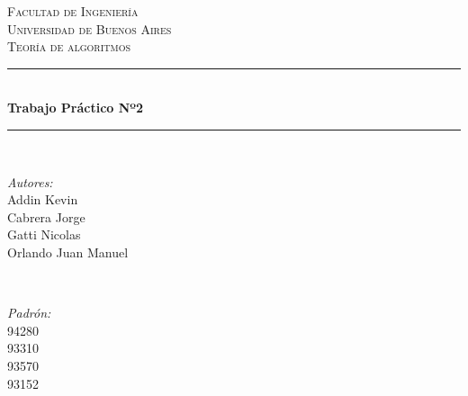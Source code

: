 \begin{titlepage}

\newcommand{\HRule}{\rule{\linewidth}{0.5mm}} %

\center %
 

\textsc{\LARGE Facultad de Ingeniería\\Universidad de Buenos Aires}\\[1.5cm] %
\textsc{\Large Teoría de algoritmos}\\[0.5cm] %


\HRule \\[0.4cm]
{ \huge \bfseries Trabajo Práctico Nº2}\\[0.4cm] %
\HRule \\[1.5cm]
 

\begin{minipage}{0.4\textwidth}
\begin{flushleft} \large
\emph{Autores:}\\
Addin Kevin\\
Cabrera Jorge\\
Gatti Nicolas\\
Orlando Juan Manuel
\end{flushleft}
\end{minipage}
~
\begin{minipage}{0.4\textwidth}
\begin{flushright} \large
\emph{Padrón:} \\
94280\\
93310\\
93570\\
93152
\end{flushright}
\end{minipage}\\[1cm]


\end{titlepage}
